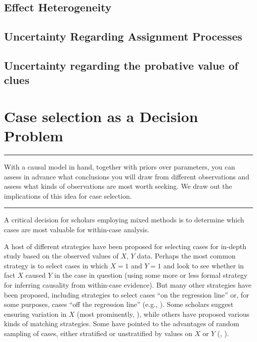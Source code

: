 \documentclass[
  12pt,
]{book}
\begin{document}
\hypertarget{effect-heterogeneity}{%
\section{Effect Heterogeneity}\label{effect-heterogeneity}}

\hypertarget{uncertainty-regarding-assignment-processes}{%
\section{Uncertainty Regarding Assignment Processes}\label{uncertainty-regarding-assignment-processes}}

\hypertarget{uncertainty-regarding-the-probative-value-of-clues}{%
\section{Uncertainty regarding the probative value of clues}\label{uncertainty-regarding-the-probative-value-of-clues}}

\hypertarget{caseselection}{%
\chapter{Case selection as a Decision Problem}\label{caseselection}}

\begin{center}\rule{0.5\linewidth}{0.5pt}\end{center}

With a causal model in hand, together with priors over parameters, you can assess in advance what conclusions you will draw from different observations and assess what kinds of observations are most worth seeking. We draw out the implications of this idea for case selection.

\begin{center}\rule{0.5\linewidth}{0.5pt}\end{center}

A critical decision for scholars employing mixed methods is to determine which cases are most valuable for within-case analysis.

A host of different strategies have been proposed for selecting cases for in-depth study based on the observed values of \(X\), \(Y\) data. Perhaps the most common strategy is to select cases in which \(X=1\) and \(Y=1\) and look to see whether in fact \(X\) caused \(Y\) in the case in question (using some more or less formal strategy for inferring causality from within-case evidence). But many other strategies have been proposed, including strategies to select cases ``on the regression line'' or, for some purposes, cases ``off the regression line'' (e.g., \citet{Lieberman2005nested}). Some scholars suggest ensuring variation in \(X\) (most prominently, \citet{king1994designing}), while others have proposed various kinds of matching strategies. Some have pointed to the advantages of random sampling of cases, either stratified or unstratified by values on \(X\) or \(Y\) (\citet{FL2008}, \citet{HerronQuinn}).
\end{document}
